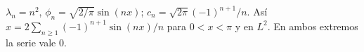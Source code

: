 $\lambda_n=n^2$, $\phi_n=\sqrt{2/\pi}\sin(nx)$; $c_n=\sqrt{2\pi}(-1)^{n+1}/n$. Así $x=2\sum_{n\ge1}(-1)^{n+1}\sin(nx)/n$ para $0<x<\pi$ y en $L^2$. En ambos extremos la serie vale 0.
